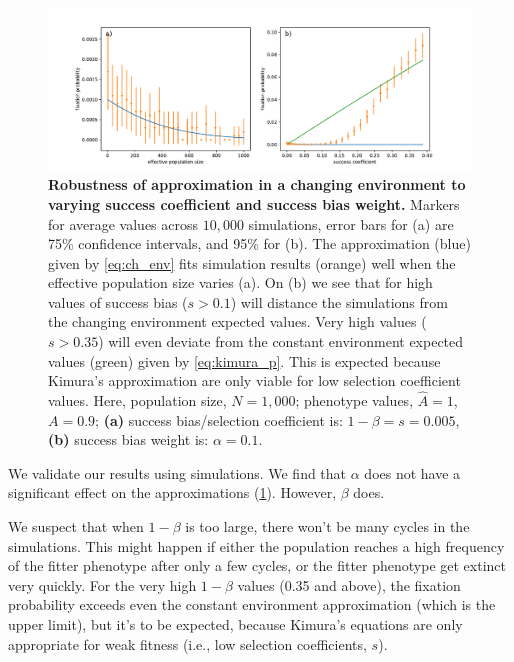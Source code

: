 \documentclass[12pt]{extarticle}
\begin{document}
\begin{figure}[h]
    \includegraphics[width=\linewidth]{../figures/changed_env/ch_env_var.pdf}
  \caption{\textbf{Robustness of approximation in a changing environment to varying success coefficient and success bias weight.}
 Markers for average values across $10,000$ simulations, error bars for (a) are 75\% confidence intervals, and 95\% for (b).
The approximation (blue) given by \cref{eq:ch_env} fits simulation results (orange) well when the effective population size varies (a).
On (b) we see that for high values of success bias ($s>0.1$) will distance the simulations from the changing environment expected values. Very high values ($s>0.35$) will even deviate from the constant environment expected values (green) given by \cref{eq:kimura_p}. This is expected because Kimura's approximation are only viable for low selection coefficient values.
  Here, population size, $N=1,000$; phenotype values, $\hat{A}=1$, $A=0.9$; \textbf{(a)} success bias/selection coefficient is: $1-\beta=s=0.005$, \textbf{(b)} success bias weight is: $\alpha=0.1$. 
  }
  \label{fig:ch_env_alpha_beta}
\end{figure}

We validate our results using simulations.
We find that $\alpha$ does not have a significant effect on the approximations (\cref{fig:ch_env_alpha_beta}).
However, $\beta$ does. 

We suspect that when $1-\beta$ is too large, there won't be many cycles in the simulations. This might happen if either the population reaches a high frequency of the fitter phenotype after only a few cycles, or the fitter phenotype get extinct very quickly. 
For the very high $1-\beta$ values (0.35 and above), the fixation probability exceeds even the constant environment approximation (which is the upper limit), but it's to be expected, because Kimura's equations are only appropriate for weak fitness (i.e., low selection coefficients, $s$).
\end{document}
